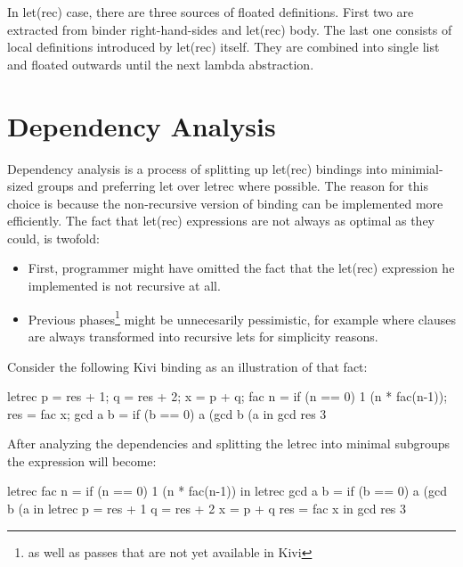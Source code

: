 \documentclass[12pt,a4paper]{report}
\begin{document}
In let(rec) case, there are three sources of floated definitions. First two are
extracted from binder right-hand-sides and let(rec) body. The last one consists
of local definitions introduced by let(rec) itself. They are combined into
single list and floated outwards until the next lambda abstraction.

\section{Dependency Analysis}
Dependency analysis is a process of splitting up let(rec) bindings
into minimial-sized groups and preferring let over letrec
where possible. The reason for this choice is because the non-recursive version
of binding can be implemented more efficiently. The fact that let(rec)
expressions are not always as optimal as they could, is twofold:
\begin{itemize}
  \item First, programmer might have omitted the fact that the
    let(rec) expression he implemented is not recursive at all.
  \item Previous phases\footnote{as well as passes that are not yet available
    in Kivi} might be unnecesarily pessimistic, for example where
    clauses are always transformed into recursive lets for simplicity
    reasons.
\end{itemize}
Consider the following Kivi binding as an illustration of that fact:

\vspace*{0.2in}
\begin{code}[style=haskell,label=lst:letrec_dependency_example,caption={Example of
  letrec before dependency analysis.}]
  letrec
      p       = res + 1;
      q       = res + 2;
      x       = p + q;
      fac n   = if (n == 0) 1 (n * fac(n-1));
      res     = fac x;
      gcd a b = if (b == 0) a (gcd b (a %
  in
      gcd res 3
\end{code}

After analyzing the dependencies and splitting the letrec into minimal
subgroups the expression will become:

\vspace*{0.2in}
\begin{code}[style=haskell,label=lst:letrec_after_anlysis,caption={letrec
  after performing dependency anlysis.}]
  letrec
      fac n = if (n == 0) 1 (n * fac(n-1))
  in letrec
      gcd a b = if (b == 0) a (gcd b (a %
  in letrec
      p = res + 1
      q = res + 2
      x = p + q
      res = fac x
  in
      gcd res 3
\end{code}
\end{document}
